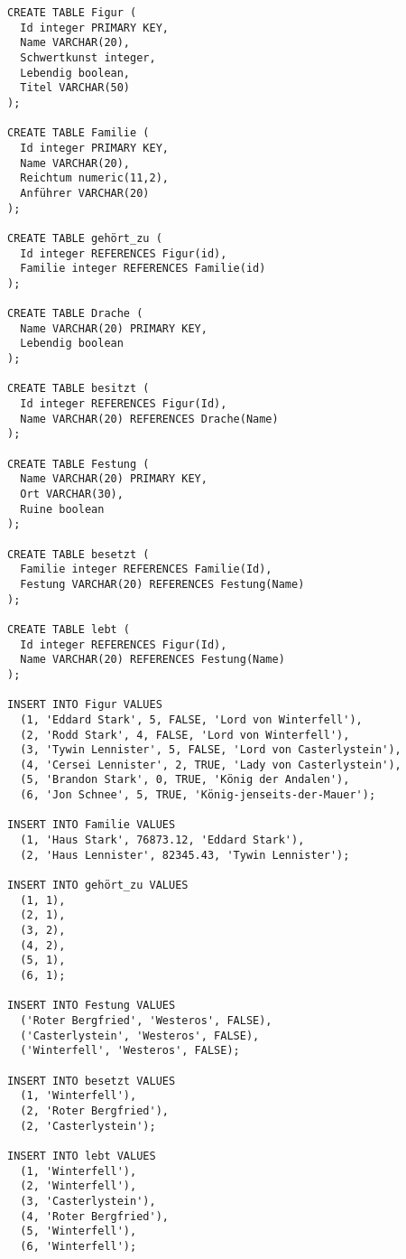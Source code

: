 \documentclass{lehramt-informatik-aufgabe}
\begin{document}
\begin{verbatim}
CREATE TABLE Figur (
  Id integer PRIMARY KEY,
  Name VARCHAR(20),
  Schwertkunst integer,
  Lebendig boolean,
  Titel VARCHAR(50)
);

CREATE TABLE Familie (
  Id integer PRIMARY KEY,
  Name VARCHAR(20),
  Reichtum numeric(11,2),
  Anführer VARCHAR(20)
);

CREATE TABLE gehört_zu (
  Id integer REFERENCES Figur(id),
  Familie integer REFERENCES Familie(id)
);

CREATE TABLE Drache (
  Name VARCHAR(20) PRIMARY KEY,
  Lebendig boolean
);

CREATE TABLE besitzt (
  Id integer REFERENCES Figur(Id),
  Name VARCHAR(20) REFERENCES Drache(Name)
);

CREATE TABLE Festung (
  Name VARCHAR(20) PRIMARY KEY,
  Ort VARCHAR(30),
  Ruine boolean
);

CREATE TABLE besetzt (
  Familie integer REFERENCES Familie(Id),
  Festung VARCHAR(20) REFERENCES Festung(Name)
);

CREATE TABLE lebt (
  Id integer REFERENCES Figur(Id),
  Name VARCHAR(20) REFERENCES Festung(Name)
);

INSERT INTO Figur VALUES
  (1, 'Eddard Stark', 5, FALSE, 'Lord von Winterfell'),
  (2, 'Rodd Stark', 4, FALSE, 'Lord von Winterfell'),
  (3, 'Tywin Lennister', 5, FALSE, 'Lord von Casterlystein'),
  (4, 'Cersei Lennister', 2, TRUE, 'Lady von Casterlystein'),
  (5, 'Brandon Stark', 0, TRUE, 'König der Andalen'),
  (6, 'Jon Schnee', 5, TRUE, 'König-jenseits-der-Mauer');

INSERT INTO Familie VALUES
  (1, 'Haus Stark', 76873.12, 'Eddard Stark'),
  (2, 'Haus Lennister', 82345.43, 'Tywin Lennister');

INSERT INTO gehört_zu VALUES
  (1, 1),
  (2, 1),
  (3, 2),
  (4, 2),
  (5, 1),
  (6, 1);

INSERT INTO Festung VALUES
  ('Roter Bergfried', 'Westeros', FALSE),
  ('Casterlystein', 'Westeros', FALSE),
  ('Winterfell', 'Westeros', FALSE);

INSERT INTO besetzt VALUES
  (1, 'Winterfell'),
  (2, 'Roter Bergfried'),
  (2, 'Casterlystein');

INSERT INTO lebt VALUES
  (1, 'Winterfell'),
  (2, 'Winterfell'),
  (3, 'Casterlystein'),
  (4, 'Roter Bergfried'),
  (5, 'Winterfell'),
  (6, 'Winterfell');
\end{verbatim}
\end{document}
